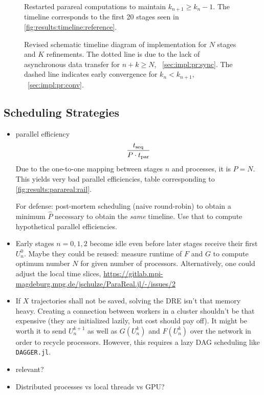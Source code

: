 \begin{figure}[t]
  \centering
  \caption[Restarted parareal computation]{
    Restarted parareal computations to maintain $k_{n+1} \geq k_n - 1$.
    The timeline corresponds to the first 20 stages seen in \autoref{fig:results:timeline:reference}.
  }
  \label{fig:impl:restart}
\end{figure}

\begin{figure}[t]
  \centering
  
  \caption[Revised schematic timeline diagram]{%
    Revised schematic timeline diagram of  implementation for $N$ stages and $K$ refinements.
    The dotted line is due to the lack of asynchronous data transfer for $n+k \geq N$,
    \cf~\autoref{sec:impl:pr:sync}.
    The dashed line indicates early convergence for $k_n < k_{n+1}$,
    \cf~\autoref{sec:impl:pr:conv}.
  }
  \label{fig:timeline:revised}
\end{figure}

\subsection{Scheduling Strategies}

\begin{itemize}
  \item
    parallel efficiency
    \begin{equation}
      \frac{t_\text{seq}}{P\cdot t_\text{par}}
    \end{equation}
    Due to the one-to-one mapping between stages $n$ and processes, it is $P = N$.
    This yields very bad parallel efficiencies, \cf table corresponding to \autoref{fig:results:parareal:rail}.

    For defense: post-mortem scheduling (\eg naive round-robin) to obtain a minimum $\hat P$ necessary to obtain the \emph{same} timeline.
    Use that to compute hypothetical parallel efficiencies.
  \item
    Early stages $n=0,1,2$ become idle even before later stages receive their first $U^0_n$.
    Maybe they could be reused: measure runtime of $F$ and $G$ to compute optimum number $N$ for given number of processors.
    Alternatively, one could adjust the local time slices, \cf \url{https://gitlab.mpi-magdeburg.mpg.de/jschulze/ParaReal.jl/-/issues/2}
  \item
    If $X$ trajectories shall not be saved, solving the \ac{DRE} isn't that memory heavy.
    Creating a connection between workers in a cluster shouldn't be that expensive (they are initialized lazily, but cost should pay off).
    It might be worth it to send $U^{k+1}_n$ as well as $G(U^k_n)$ and $F(U^k_n)$ over the network in order to recycle processors.
    However, this requires a lazy DAG scheduling like \texttt{DAGGER.jl}.
  \item
    \cite[493]{Nielsen2018} relevant?
  \item
    Distributed processes vs local threads vs GPU?
\end{itemize}

